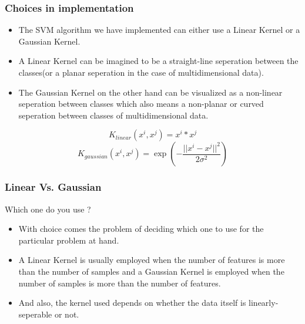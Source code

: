 \documentclass[11pt,xcolor=dvipsnames]{beamer}
\begin{document}
\begin{frame}
\frametitle{Choices in implementation}	
\begin{itemize}
\item The SVM algorithm we have implemented can either use a {\color{PineGreen}Linear Kernel} or a {\color{PineGreen}Gaussian Kernel}. \\
\item A {\color{PineGreen}Linear Kernel} can be imagined to be a {\color{PineGreen}straight-line seperation} between the classes(or a planar seperation in the case of multidimensional data).\\
\item The {\color{PineGreen}Gaussian Kernel} on the other hand can be visualized as a {\color{PineGreen}non-linear seperation} between classes which also means a non-planar or curved seperation between classes of multidimensional data.
\end{itemize}
\medskip
\begin{displaymath}K_{linear}(x^i, x^j) = x^i * x^j\end{displaymath}
\begin{displaymath}K_{gaussian}(x^i, x^j) = \exp(-\frac{||x^i - x^j||^2}{2\sigma^2})\end{displaymath}
\end{frame}


\begin{frame}
\frametitle{Linear Vs. Gaussian}
\begin{block}{Which one do you use ?}
\begin{itemize}
\item With choice comes the problem of deciding which one to use for the particular problem at hand.\\
\item A Linear Kernel is usually employed when the number of features is more than the number of samples and a Gaussian Kernel is employed when the number of samples is more than the number of features.\\
\item And also, the kernel used depends on whether the data itself is linearly-seperable or not.
\end{itemize}
\end{block}	
\end{frame}
\end{document}

